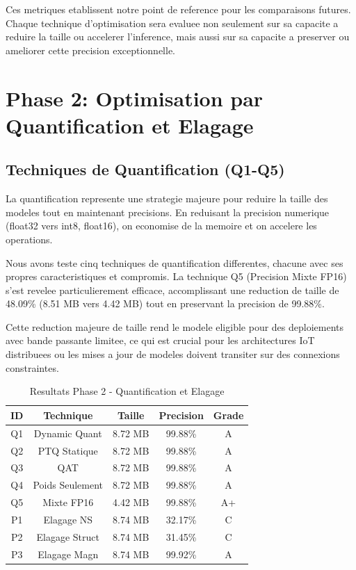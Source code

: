 \documentclass[12pt,a4paper]{report}
\begin{document}
Ces metriques etablissent notre point de reference pour les comparaisons futures. Chaque technique d'optimisation sera evaluee non seulement sur sa capacite a reduire la taille ou accelerer l'inference, mais aussi sur sa capacite a preserver ou ameliorer cette precision exceptionnelle.

\chapter{Phase 2: Optimisation par Quantification et Elagage}

\section{Techniques de Quantification (Q1-Q5)}

La quantification represente une strategie majeure pour reduire la taille des modeles tout en maintenant precisions. En reduisant la precision numerique (float32 vers int8, float16), on economise de la memoire et on accelere les operations.

Nous avons teste cinq techniques de quantification differentes, chacune avec ses propres caracteristiques et compromis. La technique Q5 (Precision Mixte FP16) s'est revelee particulierement efficace, accomplissant une reduction de taille de 48.09\% (8.51 MB vers 4.42 MB) tout en preservant la precision de 99.88\%.

Cette reduction majeure de taille rend le modele eligible pour des deploiements avec bande passante limitee, ce qui est crucial pour les architectures IoT distribuees ou les mises a jour de modeles doivent transiter sur des connexions constraintes.

\begin{table}[H]
\centering
\small
\begin{tabular}{|c|c|c|c|c|}
\hline
\textbf{ID} & \textbf{Technique} & \textbf{Taille} & \textbf{Precision} & \textbf{Grade} \\
\hline
Q1 & Dynamic Quant & 8.72 MB & 99.88\% & A \\
Q2 & PTQ Statique & 8.72 MB & 99.88\% & A \\
Q3 & QAT & 8.72 MB & 99.88\% & A \\
Q4 & Poids Seulement & 8.72 MB & 99.88\% & A \\
\cellcolor{lightblue} Q5 & \cellcolor{lightblue} Mixte FP16 & \cellcolor{lightblue} 4.42 MB & \cellcolor{lightblue} 99.88\% & \cellcolor{lightblue} A+ \\
\hline
P1 & Elagage NS & 8.74 MB & 32.17\% & C \\
P2 & Elagage Struct & 8.74 MB & 31.45\% & C \\
\cellcolor{lightblue} P3 & \cellcolor{lightblue} Elagage Magn & \cellcolor{lightblue} 8.74 MB & \cellcolor{lightblue} 99.92\% & \cellcolor{lightblue} A \\
\hline
\end{tabular}
\caption{Resultats Phase 2 - Quantification et Elagage}
\end{table}
\end{document}
